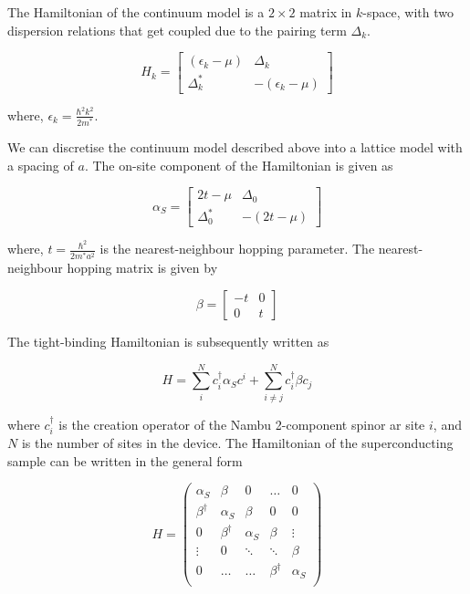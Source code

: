 The Hamiltonian of the continuum model is a $2 \times 2$ matrix in $k$-space, with two dispersion relations that get coupled due to the pairing term $\Delta_{k}$.

\begin{equation*}
    H_{k} = \begin{bmatrix}
            (\epsilon_{k}-\mu) & \Delta_{k} \\
            \Delta^{*}_{k} & -(\epsilon_{k}-\mu)
    \end{bmatrix}
\end{equation*}

where, $\epsilon_{k} = \frac{\hbar^{2}k^{2}}{2m^{*}}$. \par 

We can discretise the continuum model described above into a lattice model with a spacing of $a$. The on-site component of the Hamiltonian is given as 

\begin{equation}
    \alpha_{S} = \begin{bmatrix}
          2t-\mu & \Delta_{0} \\
          \Delta_{0}^{*} & -(2t-\mu)  
    \end{bmatrix}
\end{equation}

where, $t = \frac{\hbar^{2}}{2m^{*}a^{2}}$ is the nearest-neighbour hopping parameter. The nearest-neighbour hopping matrix is given by 

\begin{equation}
    \beta = \begin{bmatrix}
          -t & 0\\
          0 & t  
    \end{bmatrix}    
\end{equation}

The tight-binding Hamiltonian is subsequently written as

\begin{equation}
    H = \sum_{i}^{N}c^{\dagger}_{i}\alpha_{S}c^{i} + \sum_{i\neq j}^{N}c^{\dagger}_{i}\beta c_{j}    
\end{equation}

where $c^{\dagger}_{i}$ is the creation operator of the Nambu 2-component spinor ar site $i$, and $N$ is the number of sites in the device. The Hamiltonian of the superconducting sample can be written in the general form 

\begin{equation}
H = \begin{pmatrix}
\alpha_S & \beta & 0 & \dots & 0 \\
\beta^{\dagger} & \alpha_S & \beta & 0 & 0 \\
0 & \beta^{\dagger} & \alpha_S & \beta & \vdots \\
\vdots & 0 & \ddots & \ddots & \beta \\
0 & \dots & \dots & \beta^{\dagger} & \alpha_S \\
\end{pmatrix}   
\end{equation}


